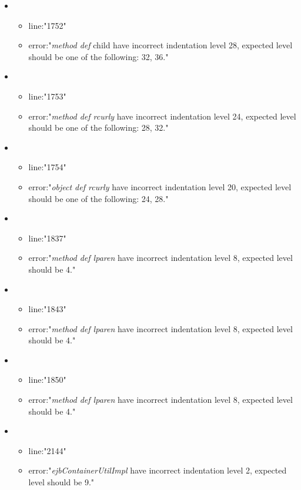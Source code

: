 \begin{itemize}
	\item 
	\begin{itemize} 
		\item line:"1752" 
		\item error:"\emph{method def} child have incorrect indentation level 28, expected level should be one of the following: 32, 36." 
	\end{itemize}
	\item 
	\begin{itemize} 
		\item line:"1753" 
		\item error:"\emph{method def rcurly} have incorrect indentation level 24, expected level should be one of the following: 28, 32." 
	\end{itemize}
	\item 
	\begin{itemize} 
		\item line:"1754" 
		\item error:"\emph{object def rcurly} have incorrect indentation level 20, expected level should be one of the following: 24, 28." 
	\end{itemize}
	\item 
	\begin{itemize} 
		\item line:"1837" 
		\item error:"\emph{method def lparen} have incorrect indentation level 8, expected level should be 4." 
	\end{itemize}
	\item 
	\begin{itemize} 
		\item line:"1843" 
		\item error:"\emph{method def lparen} have incorrect indentation level 8, expected level should be 4." 
	\end{itemize}
	\item 
	\begin{itemize} 
		\item line:"1850" 
		\item error:"\emph{method def lparen} have incorrect indentation level 8, expected level should be 4." 
	\end{itemize}
	\item 
	\begin{itemize} 
		\item line:"2144" 
		\item error:"\emph{ejbContainerUtilImpl} have incorrect indentation level 2, expected level should be 9." 

\end{itemize}
\end{itemize}
